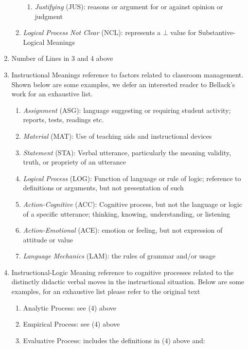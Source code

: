\documentclass[conference]{IEEEtran}
\begin{document}
\begin{enumerate}
\begin{enumerate}
\begin{enumerate}
      \item \emph{Justifying} (JUS): reasons or argument for or against opinion or judgment
      \end{enumerate}
    \item \emph{Logical Process Not Clear} (NCL): represents a $\bot$ value for Substantive-Logical Meanings
    \end{enumerate}
  \item {Number of Lines in 3 and 4 above}
  \item {Instructional Meanings}  reference to factors related to classroom
    management. Shown below are some examples, we defer an interested reader to
    Bellack's work for an exhaustive list.
    \begin{enumerate}
      \item \emph{Assignment} (ASG): language suggesting or requiring student activity; reports, tests, readings etc.
      \item \emph{Material} (MAT): Use of teaching aids and instructional devices
      \item \emph{Statement} (STA): Verbal utterance, particularly the meaning validity, truth, or propriety of an utterance
      \item \emph{Logical Process} (LOG): Function of language or rule of logic; reference to definitions or arguments, but not presentation of such
      \item \emph{Action-Cognitive} (ACC): Cognitive process, but not the language or logic of a specific utterance; thinking, knowing, understanding, or listening
      \item \emph{Action-Emotional} (ACE): emotion or feeling, but not expression of attitude or value
      \item \emph{Language Mechanics} (LAM): the rules of grammar and/or usage
    \end{enumerate}
  \item {Instructional-Logic Meaning}  reference to cognitive processes related
    to the distinctly didactic verbal moves in the instructional situation.
    Below are some examples, for an exhaustive list please refer to the original
    text\cite{bellack1966language} 
  \begin{enumerate}
    \item Analytic Process: see (4) above
    \item Empirical Process: see (4) above
    \item Evaluative Process: includes the definitions in (4) above and:
    \begin{enumerate}

\end{enumerate}
\end{enumerate}
\end{enumerate}
\end{document}
